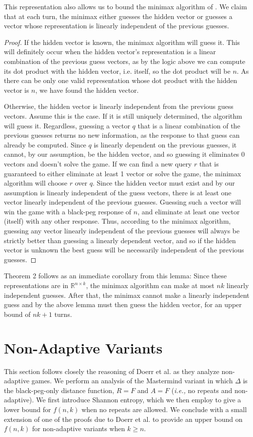 \documentclass[12pt, a4paper]{article}
\newcommand{\R}{\mathbb{R}}           %
\begin{document}
This representation also allows us to bound the minimax algorithm of \cite{DK76}. We claim that at each turn, the minimax either guesses the hidden vector or guesses a vector whose representation is linearly independent of the previous guesses. 
\begin{proof}
	If the hidden vector is known, the minimax algorithm will guess it. This will definitely occur when the hidden vector's representation is a linear combination of the previous guess vectors, as by the logic above we can compute its dot product with the hidden vector, i.e. itself, so the dot product will be $n$. As there can be only one valid representation whose dot product with the hidden vector is $n$, we have found the hidden vector.
	
	Otherwise, the hidden vector is linearly independent from the previous guess vectors. Assume this is the case. If it is still uniquely determined, the algorithm will guess it. Regardless, guessing a vector $q$ that is a linear combination of the previous guesses returns no new information, as the response to that guess can already be computed. Since $q$ is linearly dependent on the previous guesses, it cannot, by our assumption, be the hidden vector, and so guessing it eliminates 0 vectors and doesn't solve the game. If we can find a new query $r$ that is guaranteed to either eliminate at least 1 vector or solve the game, the minimax algorithm will choose $r$ over $q$. Since the hidden vector must exist and by our assumption is linearly independent of the guess vectors, there is at least one vector linearly independent of the previous guesses. Guessing such a vector will win the game with a black-peg response of $n$, and eliminate at least one vector (itself) with any other response. Thus, according to the minimax algorithm, guessing any vector linearly independent of the previous guesses will always be strictly better than guessing a linearly dependent vector, and so if the hidden vector is unknown the best guess will be necessarily independent of the previous guesses.
\end{proof}
Theorem 2 follows as an immediate corollary from this lemma: Since these representations are in $\R^{n \times k}$, the minimax algorithm can make at most $nk$ linearly independent guesses. After that, the minimax cannot make a linearly independent guess and by the above lemma must then guess the hidden vector, for an upper bound of $nk+1$ turns.


\section{Non-Adaptive Variants}
This section follows closely the reasoning of Doerr et al. \cite{DS13} as they analyze non-adaptive games.  We perform an analysis of the Mastermind variant in which $\Delta$ is the black-peg-only distance function, $R=F$ and $A=F$ (\textit{i.e.,} no repeats and non-adaptive). We first introduce Shannon entropy, which we then employ to give a lower bound for $f(n,k)$ when no repeats are allowed. We conclude with a small extension of one of the proofs due to Doerr et al. to provide an upper bound on $f(n,k)$ for non-adaptive variants when $k\ge n$.
\end{document}
